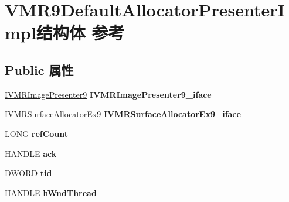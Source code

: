 \hypertarget{struct_v_m_r9_default_allocator_presenter_impl}{}\section{V\+M\+R9\+Default\+Allocator\+Presenter\+Impl结构体 参考}
\label{struct_v_m_r9_default_allocator_presenter_impl}
\subsection*{Public 属性}
\begin{DoxyCompactItemize}
\item 
\mbox{\label{struct_v_m_r9_default_allocator_presenter_impl_a9bb5d137d73ca769432e2a852ec56252}} 
\hyperlink{interface_i_v_m_r_image_presenter9}{I\+V\+M\+R\+Image\+Presenter9} {\bfseries I\+V\+M\+R\+Image\+Presenter9\+\_\+iface}
\item 
\mbox{\label{struct_v_m_r9_default_allocator_presenter_impl_aeb57589fad8aa41f31cc01c51fd2bfe5}} 
\hyperlink{interface_i_v_m_r_surface_allocator_ex9}{I\+V\+M\+R\+Surface\+Allocator\+Ex9} {\bfseries I\+V\+M\+R\+Surface\+Allocator\+Ex9\+\_\+iface}
\item 
\mbox{\label{struct_v_m_r9_default_allocator_presenter_impl_a55d6d7692f1b4b1bfd91077e7e7ee309}} 
L\+O\+NG {\bfseries ref\+Count}
\item 
\mbox{\label{struct_v_m_r9_default_allocator_presenter_impl_abc13cf7c65406e88968a69037de22f9d}} 
\hyperlink{interfacevoid}{H\+A\+N\+D\+LE} {\bfseries ack}
\item 
\mbox{\label{struct_v_m_r9_default_allocator_presenter_impl_addd67468a113592a5d29a789d6114947}} 
D\+W\+O\+RD {\bfseries tid}
\item 
\mbox{\label{struct_v_m_r9_default_allocator_presenter_impl_a0c896f13ae37e7a18ef70d5f0a4b8118}} 
\hyperlink{interfacevoid}{H\+A\+N\+D\+LE} {\bfseries h\+Wnd\+Thread}
\item 

\end{DoxyCompactItemize}
